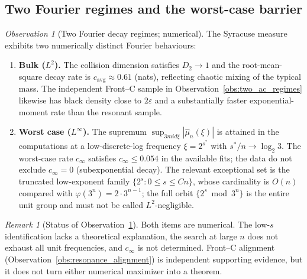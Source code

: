 \documentclass[12pt,a4paper]{article}
\theoremstyle{remark}
\newtheorem{remark}[theorem]{Remark}
\newtheorem{observation}[theorem]{Observation}
\begin{document}
\subsection{Two Fourier regimes and the worst-case barrier}
\begin{observation}[Two Fourier decay regimes; numerical]
\label{obs:two_regimes}
The Syracuse measure exhibits two numerically distinct Fourier behaviours:
\begin{enumerate}
\item[(i)] \textbf{Bulk ($L^2$).} The collision dimension satisfies $D_2\to1$ and
the root-mean-square decay rate is $c_{\mathrm{avg}}\approx0.61$ (nats),
reflecting chaotic mixing of the typical mass.  The independent Front--C
sample in Observation~\ref{obs:two_ac_regimes} likewise has black density close
to $2\varepsilon$ and a substantially faster exponential-moment rate than the
resonant sample.
\item[(ii)] \textbf{Worst case ($L^\infty$).} The supremum
$\sup_{3
mid\xi}|\hat\mu_n(\xi)|$ is attained in the computations at a
low-discrete-log frequency $\xi=2^{s^*}$ with $s^*/n\to\log_2 3$.  The
worst-case rate $c_\infty$ satisfies $c_\infty\le0.054$ in the available fits;
the data do not exclude $c_\infty=0$ (subexponential decay).  The relevant
exceptional set is the truncated low-exponent family
$\{2^s:0\le s\le Cn\}$, whose cardinality is $O(n)$ compared with
$\varphi(3^n)=2\cdot3^{n-1}$; the full orbit $\{2^s\bmod3^n\}$ is the entire
unit group and must not be called $L^2$-negligible.
\end{enumerate}
\end{observation}
\begin{remark}[Status of Observation~\ref{obs:two_regimes}]
Both items are numerical.  The low-$s$ identification lacks a theoretical
explanation, the search at large $n$ does not exhaust all unit frequencies,
and $c_\infty$ is not determined.  Front--C alignment
(Observation~\ref{obs:resonance_alignment}) is independent supporting evidence,
but it does not turn either numerical maximizer into a theorem.
\end{remark}
\end{document}
